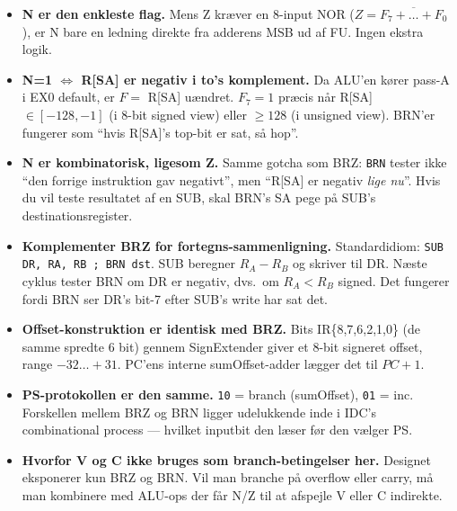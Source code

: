 \documentclass[11pt,a4paper]{article}
\begin{document}
\begin{itemize}
  \item \textbf{N er den enkleste flag.} Mens Z kræver en 8-input NOR (\(Z = \overline{F_7 + \ldots + F_0}\)),
        er N bare en ledning direkte fra adderens MSB ud af FU. Ingen ekstra logik.

  \item \textbf{N=1 $\iff$ R[SA] er negativ i to's komplement.}
        Da ALU'en kører pass-A i EX0 default, er $F = $ R[SA] uændret.
        $F_7 = 1$ præcis når R[SA] $\in [-128, -1]$ (i 8-bit signed view) eller $\geq 128$ (i unsigned view).
        BRN'er fungerer som ``hvis R[SA]'s top-bit er sat, så hop''.

  \item \textbf{N er kombinatorisk, ligesom Z.}
        Samme gotcha som BRZ: \texttt{BRN} tester ikke ``den forrige instruktion gav negativt'',
        men ``R[SA] er negativ \emph{lige nu}''. Hvis du vil teste resultatet af en SUB,
        skal BRN's SA pege på SUB's destinationsregister.

  \item \textbf{Komplementer BRZ for fortegns-sammenligning.}
        Standardidiom: \texttt{SUB DR, RA, RB ; BRN dst}. SUB beregner $R_A - R_B$ og skriver til DR.
        Næste cyklus tester BRN om DR er negativ, dvs.\ om $R_A < R_B$ signed.
        Det fungerer fordi BRN ser DR's bit-7 efter SUB's write har sat det.

  \item \textbf{Offset-konstruktion er identisk med BRZ.}
        Bits IR\{8,7,6,2,1,0\} (de samme spredte 6 bit) gennem SignExtender giver et 8-bit signeret offset,
        range $-32 \ldots +31$. PC'ens interne sumOffset-adder lægger det til $PC+1$.

  \item \textbf{PS-protokollen er den samme.} \texttt{10} = branch (sumOffset), \texttt{01} = inc.
        Forskellen mellem BRZ og BRN ligger udelukkende inde i IDC's combinational process ---
        hvilket inputbit den læser før den vælger PS.

  \item \textbf{Hvorfor V og C ikke bruges som branch-betingelser her.}
        Designet eksponerer kun BRZ og BRN. Vil man branche på overflow eller carry, må man
        kombinere med ALU-ops der får N/Z til at afspejle V eller C indirekte.
\end{itemize}
\end{document}
